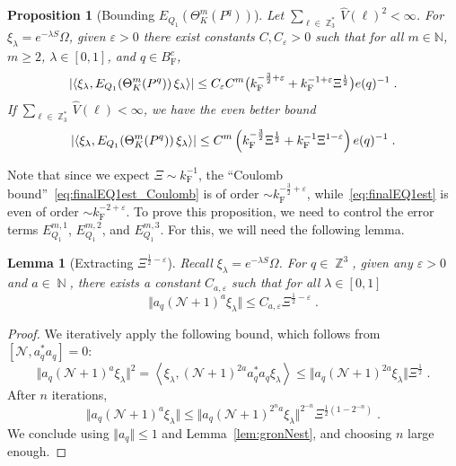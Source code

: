 \documentclass[12pt,a4paper]{article}
\numberwithin{equation}{section}
\newcommand{\cN}{\mathcal{N}}
\newcommand{\NNN}{\mathbb{N}}
\newcommand{\1}{\mathbb{I}}
\newcommand{\F}{\mathrm{F}}
\DeclareMathOperator{\N}{\mathbb{N}}
\DeclareMathOperator{\Z}{\mathbb{Z}}
\newcommand{\half}{\frac{1}{2}}
\newcommand{\eva}[1]{\left\langle #1 \right\rangle}
\theoremstyle{plain}
\newtheorem{lemma}[theorem]{Lemma}
\newtheorem{proposition}[theorem]{Proposition}
\theoremstyle{definition}
\theoremstyle{remark}
\theoremstyle{plain}
\theoremstyle{definition}
\theoremstyle{remark}
\begin{document}
\begin{proposition}[Bounding $E_{Q_1}(\Theta^m_{K}(P^q))$]\label{prop:finEQ1est}
Let $ \sum_{\ell \in \Z_3^*} \hat{V}(\ell)^2 < \infty $. For $\xi_\lambda = e^{-\lambda S} \Omega$, given $ \varepsilon > 0 $ there exist constants $ C, C_\varepsilon > 0 $ such that for all $ m \in \NNN $, $ m \ge 2 $, $ \lambda \in [0,1] $, and $ q \in B_{\F}^c $,
\begin{equation} \label{eq:finalEQ1est_Coulomb}
	\abs{\eva{\xi_\lambda, E_{Q_1}\!\left(\Theta^m_K(P^q)\right) \xi_\lambda}}
	\leq C_\varepsilon C^m \big( k_{\F}^{-\frac 32 + \varepsilon}
		+ k_{\F}^{-1 + \varepsilon} \Xi^\half \big)
		e(q)^{-1} \;.
\end{equation}
If $ \sum_{\ell \in \Z_3^*} \hat{V}(\ell) < \infty $, we have the even better bound
\begin{equation} \label{eq:finalEQ1est}
	\abs{\eva{\xi_\lambda, E_{Q_1}\!\left(\Theta^m_K(P^q)\right) \xi_\lambda}}
	\leq C^m \left(
		k_{\F}^{-\frac{3}{2}} \Xi^\half
		+ k_{\F}^{-1}\Xi^{1-\varepsilon} \right) e(q)^{-1} \;.
\end{equation}
\end{proposition}


\textcolor{green!30!black}{Note that since we expect $ \Xi \sim k_{\F}^{-1} $, the ``Coulomb bound''~\eqref{eq:finalEQ1est_Coulomb} is of order $ \sim k_{\F}^{-\frac 32 + \varepsilon} $, while~\eqref{eq:finalEQ1est} is even of order $ \sim k_{\F}^{-2 + \varepsilon} $.}
To prove this proposition, we need to control the error terms $ E^{m,1}_{Q_1} $, $ E^{m,2}_{Q_1} $, and $ E^{m,3}_{Q_1} $. For this, we will need the following lemma.

\begin{lemma} [Extracting $ \Xi^{\half-\varepsilon} $] \label{lem:Xi_halfminusepsilon}
Recall $ \xi_\lambda = e^{-\lambda S} \Omega $. For $ q \in \Z^3 $, given any $ \varepsilon > 0 $ and $ a \in \N $, there exists a constant $ C_{a,\varepsilon} $ such that for all $ \lambda \in [0,1] $
\begin{equation} \label{eq:Xi_halfminusepsilon}
	\Vert a_q (\cN + 1)^a \xi_\lambda \Vert
	\le C_{a,\varepsilon} \Xi^{\half-\varepsilon} \;.
\end{equation}
\end{lemma}

\begin{proof}
We iteratively apply the following bound, which follows from $ [\cN, a_q^* a_q] = 0 $:
\begin{equation}
	\Vert a_q (\cN + 1)^a \xi_\lambda \Vert^2
	= \eva{\xi_\lambda, (\cN + 1)^{2a} a_q^* a_q \xi_\lambda}
	\le \Vert a_q (\cN + 1)^{2a} \xi_\lambda \Vert \Xi^{\frac 12} \;.
\end{equation}
After $ n $ iterations,
\begin{equation}
	\Vert a_q (\cN + 1)^a \xi_\lambda \Vert
	\le \Vert a_q (\cN + 1)^{2^n a} \xi_\lambda \Vert^{2^{-n}} \Xi^{\half (1-2^{-n})} \;.
\end{equation}
We conclude using $ \Vert a_q \Vert \le 1 $ and Lemma~\ref{lem:gronNest}, and choosing $ n $ large enough.
\end{proof}
\end{document}
